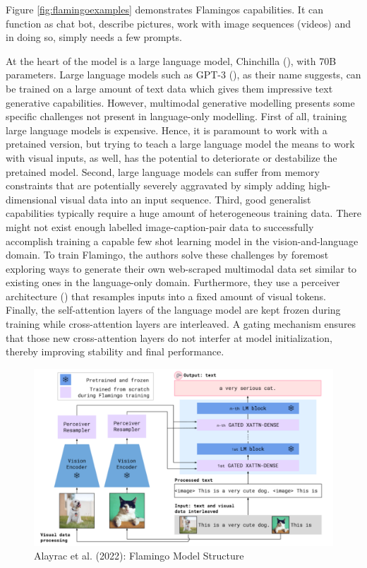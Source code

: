 \documentclass[
]{krantz}
\begin{document}
Figure \ref{fig:flamingoexamples} demonstrates Flamingos capabilities. It can function as chat bot, describe pictures, work with image sequences (videos) and in doing so, simply needs a few prompts.

At the heart of the model is a large language model, Chinchilla (\citet{hoffmann2022training}), with 70B parameters. Large language models such as GPT-3 (\citet{brown2020language}), as their name suggests, can be trained on a large amount of text data which gives them impressive text generative capabilities.
However, multimodal generative modelling presents some specific challenges not present in language-only modelling. First of all, training large language models is expensive. Hence, it is paramount to work with a pretained version, but trying to teach a large language model the means to work with visual inputs, as well, has the potential to deteriorate or destabilize the pretained model. Second, large language models can suffer from memory constraints that are
potentially severely aggravated by simply adding high-dimensional visual data into an input sequence. Third, good generalist capabilities typically require a huge amount of heterogeneous training data. There might not exist
enough labelled image-caption-pair data to successfully accomplish training a capable few shot learning model in the vision-and-language domain.
To train Flamingo, the authors solve these challenges by foremost exploring ways to generate their own web-scraped multimodal data set similar to existing ones in the language-only domain. Furthermore, they use a perceiver architecture (\citet{jaegle2021perceiver}) that resamples inputs into a fixed amount of visual tokens. Finally, the self-attention layers of the language model are kept frozen during training while cross-attention layers are interleaved. A gating
mechanism ensures that those new cross-attention layers do not interfer at model initialization, thereby improving stability and final performance.

\begin{figure}

{\centering \includegraphics[width=1\linewidth]{figures/05-chapter2/flamingoarc} 

}

\caption{Alayrac et al. (2022): Flamingo Model Structure}\label{fig:flamingoarc}
\end{figure}
\end{document}
